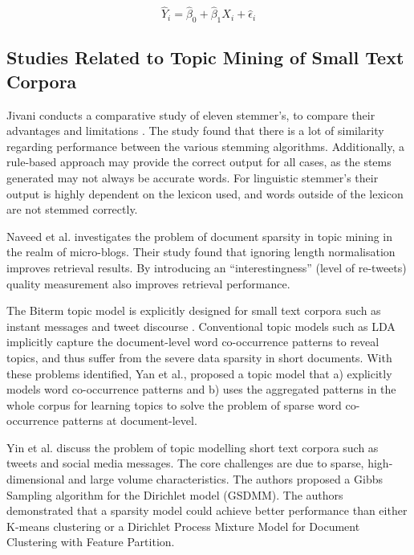 \begin{equation}
\hat{Y}_i = \hat{\beta}_0 + \hat{\beta}_1 X_i + \hat{\epsilon}_i
\end{equation}

\subsection{Studies Related to Topic Mining of Small Text Corpora}

Jivani conducts a comparative study of eleven stemmer's, to compare their advantages and limitations \cite{jivani2011comparative}. The study found that there is a lot of similarity regarding performance between the various stemming algorithms. Additionally, a rule-based approach may provide the correct output for all cases, as the stems generated may not always be accurate words. For linguistic stemmer's their output is highly dependent on the lexicon used, and words outside of the lexicon are not stemmed correctly.

Naveed et al. \cite{naveed2011searching} investigates the problem of document sparsity in topic mining in the realm of micro-blogs. Their study found that ignoring length normalisation improves retrieval results. By introducing an ``interestingness'' (level of re-tweets) quality measurement also improves retrieval performance. 

The Biterm topic model is explicitly designed for small text corpora such as instant messages and tweet discourse \cite{yan2013biterm}. Conventional topic models such as LDA implicitly capture the document-level word co-occurrence patterns to reveal topics, and thus suffer from the severe data sparsity in short documents. With these problems identified, Yan et al., proposed a topic model that a) explicitly models word co-occurrence patterns and b) uses the aggregated patterns in the whole corpus for learning topics to solve the problem of sparse word co-occurrence patterns at document-level. 

Yin et al. \cite{yin2014dirichlet} discuss the problem of topic modelling short text corpora such as tweets and social media messages. The core challenges are due to sparse, high-dimensional and large volume characteristics. The authors proposed a Gibbs Sampling algorithm for the Dirichlet model (GSDMM). The authors demonstrated that a sparsity model could achieve better performance than either K-means clustering or a Dirichlet Process Mixture Model for Document Clustering with Feature Partition.

